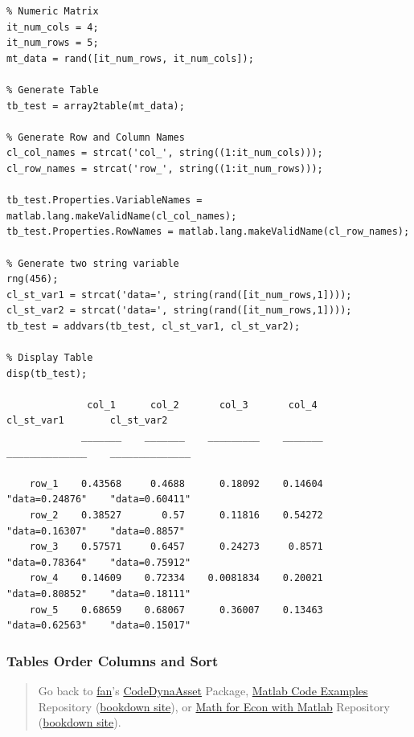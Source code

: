 \documentclass[
]{book}
\begin{document}
\begin{verbatim}
% Numeric Matrix
it_num_cols = 4;
it_num_rows = 5;
mt_data = rand([it_num_rows, it_num_cols]);

% Generate Table
tb_test = array2table(mt_data);

% Generate Row and Column Names
cl_col_names = strcat('col_', string((1:it_num_cols)));
cl_row_names = strcat('row_', string((1:it_num_rows)));

tb_test.Properties.VariableNames = matlab.lang.makeValidName(cl_col_names);
tb_test.Properties.RowNames = matlab.lang.makeValidName(cl_row_names);

% Generate two string variable
rng(456);
cl_st_var1 = strcat('data=', string(rand([it_num_rows,1])));
cl_st_var2 = strcat('data=', string(rand([it_num_rows,1])));
tb_test = addvars(tb_test, cl_st_var1, cl_st_var2);

% Display Table
disp(tb_test);

              col_1      col_2       col_3       col_4       cl_st_var1        cl_st_var2  
             _______    _______    _________    _______    ______________    ______________

    row_1    0.43568     0.4688      0.18092    0.14604    "data=0.24876"    "data=0.60411"
    row_2    0.38527       0.57      0.11816    0.54272    "data=0.16307"    "data=0.8857" 
    row_3    0.57571     0.6457      0.24273     0.8571    "data=0.78364"    "data=0.75912"
    row_4    0.14609    0.72334    0.0081834    0.20021    "data=0.80852"    "data=0.18111"
    row_5    0.68659    0.68067      0.36007    0.13463    "data=0.62563"    "data=0.15017"
\end{verbatim}

\hypertarget{tables-order-columns-and-sort}{%
\subsubsection{Tables Order Columns and Sort}\label{tables-order-columns-and-sort}}

\begin{quote}
Go back to \href{http://fanwangecon.github.io/}{fan}'s \href{https://fanwangecon.github.io/CodeDynaAsset/}{CodeDynaAsset} Package, \href{https://fanwangecon.github.io/M4Econ/}{Matlab Code Examples} Repository (\href{https://fanwangecon.github.io/M4Econ/bookdown}{bookdown site}), or \href{https://fanwangecon.github.io/Math4Econ/}{Math for Econ with Matlab} Repository (\href{https://fanwangecon.github.io/Math4Econ/bookdown}{bookdown site}).
\end{quote}
\end{document}
